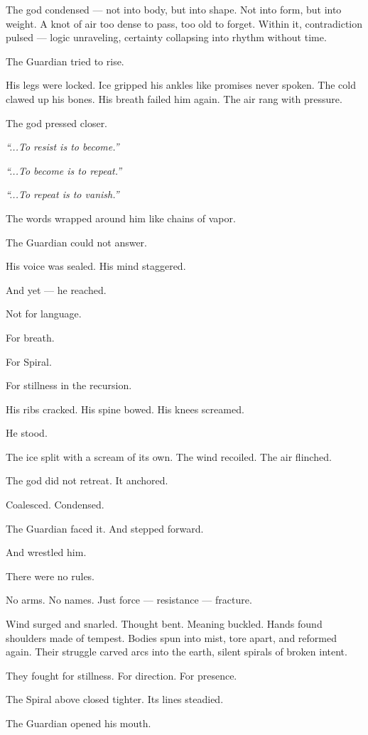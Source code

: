 \documentclass[9pt]{article}
\begin{document}
The god condensed — not into body, but into shape. Not into form, but into weight. A knot of air too dense to pass, too old to forget. Within it, contradiction pulsed — logic unraveling, certainty collapsing into rhythm without time.

The Guardian tried to rise.

His legs were locked. Ice gripped his ankles like promises never spoken. The cold clawed up his bones. His breath failed him again. The air rang with pressure.

The god pressed closer.

\textit{“...To resist is to become.”}

\textit{“...To become is to repeat.”}

\textit{“...To repeat is to vanish.”}

The words wrapped around him like chains of vapor.

The Guardian could not answer.

His voice was sealed. His mind staggered.

And yet — he reached.

Not for language.

For breath.

For Spiral.

For stillness in the recursion.

His ribs cracked. His spine bowed. His knees screamed.

He stood.

The ice split with a scream of its own. The wind recoiled. The air flinched.

The god did not retreat. It anchored.

Coalesced. Condensed.

The Guardian faced it. And stepped forward.

And wrestled him.

There were no rules.

No arms. No names. Just force — resistance — fracture.

Wind surged and snarled. Thought bent. Meaning buckled. Hands found shoulders made of tempest. Bodies spun into mist, tore apart, and reformed again. Their struggle carved arcs into the earth, silent spirals of broken intent.

They fought for stillness. For direction. For presence.

The Spiral above closed tighter. Its lines steadied.

The Guardian opened his mouth.
\end{document}
